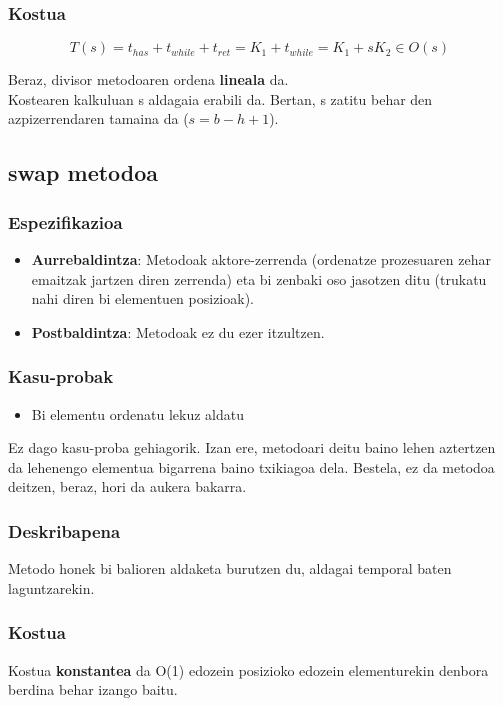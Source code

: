 \documentclass[a4paper,10pt]{report}
\begin{document}
		\subsubsection*{Kostua}
			\[
				T(s) = t_{has} + t_{while} + t_{ret}= K_{1} + t_{while} = K_{1} + sK_{2} \in O(s)
			\]
			
			Beraz, divisor metodoaren ordena \textbf{lineala} da.\\
			Kostearen kalkuluan s aldagaia erabili da. Bertan, s zatitu behar den azpizerrendaren tamaina da ($s = b - h + 1$).
	
	\subsection{swap metodoa}
		\subsubsection*{Espezifikazioa}
			\begin{itemize}
				\item \textbf{Aurrebaldintza}: Metodoak aktore-zerrenda (ordenatze prozesuaren zehar emaitzak jartzen diren zerrenda) eta bi zenbaki oso jasotzen ditu (trukatu nahi diren bi elementuen posizioak).
				\item \textbf{Postbaldintza}: Metodoak ez du ezer itzultzen.
			\end{itemize}
		\subsubsection*{Kasu-probak}
		\begin{itemize}
			\item Bi elementu ordenatu lekuz aldatu
		\end{itemize}
		Ez dago kasu-proba gehiagorik. Izan ere, metodoari deitu baino lehen aztertzen da lehenengo elementua bigarrena baino txikiagoa dela. Bestela, ez da metodoa deitzen, beraz, hori da aukera bakarra.
		\subsubsection*{Deskribapena}
			Metodo honek bi balioren aldaketa burutzen du, aldagai temporal baten laguntzarekin.
		\subsubsection*{Kostua}
			Kostua \textbf{konstantea} da O(1) edozein posizioko edozein elementurekin denbora berdina behar izango baitu.
\end{document}
